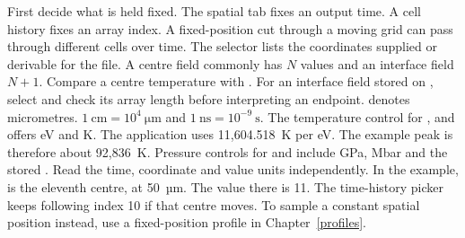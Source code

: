 First decide what is held fixed. The spatial tab fixes an output time. A cell history fixes an array index. A fixed-position cut through a moving grid can pass through different cells over time.
The selector lists the coordinates supplied or derivable for the file. A centre field commonly has \(N\) values and an interface field \(N+1\). Compare a centre temperature with . For an interface field stored on , select  and check its array length before interpreting an endpoint.
 denotes micrometres. \(1~\mathrm{cm}=10^4~\mathrm{\mu m}\) and \(1~\mathrm{ns}=10^{-9}~\mathrm{s}\). The temperature control for ,  and  offers eV and K. The application uses 11,604.518~K per eV. The example peak is therefore about 92,836~K. Pressure controls for  and  include GPa, Mbar and the stored . Read the time, coordinate and value units independently.
In the example,  is the eleventh centre, at 50~µm. The  value there is 11. The time-history picker keeps following index 10 if that centre moves. To sample a constant spatial position instead, use a fixed-position profile in Chapter~\ref{profiles}.
